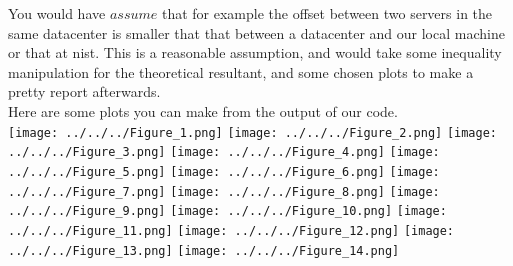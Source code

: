 \documentclass[a4paper,fleqn]{report}
\begin{document}
You would have $assume$ that for example the offset between two servers in the same datacenter is smaller that that between a datacenter and our local machine or that at nist. This is a reasonable assumption, and would take some inequality manipulation for the theoretical resultant, and some chosen plots to make a pretty report afterwards. \\


Here are some plots you can make from the output of our code.\\


\texttt{[image: ../../../Figure\_1.png]}
\texttt{[image: ../../../Figure\_2.png]}
\texttt{[image: ../../../Figure\_3.png]}
\texttt{[image: ../../../Figure\_4.png]}
\texttt{[image: ../../../Figure\_5.png]}
\texttt{[image: ../../../Figure\_6.png]}
\texttt{[image: ../../../Figure\_7.png]}
\texttt{[image: ../../../Figure\_8.png]}
\texttt{[image: ../../../Figure\_9.png]}
\texttt{[image: ../../../Figure\_10.png]}
\texttt{[image: ../../../Figure\_11.png]}
\texttt{[image: ../../../Figure\_12.png]}
\texttt{[image: ../../../Figure\_13.png]}
\texttt{[image: ../../../Figure\_14.png]}
\end{document}
